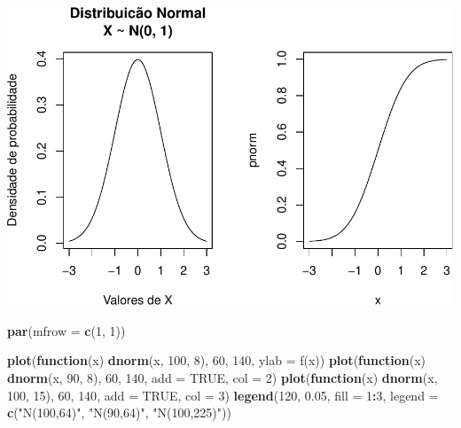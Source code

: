 \documentclass[
]{book}
\newenvironment{Shaded}{\begin{snugshade}}{\end{snugshade}}
\newcommand{\AttributeTok}[1]{\textcolor[rgb]{0.13,0.29,0.53}{#1}}
\newcommand{\ConstantTok}[1]{\textcolor[rgb]{0.56,0.35,0.01}{#1}}
\newcommand{\ControlFlowTok}[1]{\textcolor[rgb]{0.13,0.29,0.53}{\textbf{#1}}}
\newcommand{\DecValTok}[1]{\textcolor[rgb]{0.00,0.00,0.81}{#1}}
\newcommand{\FloatTok}[1]{\textcolor[rgb]{0.00,0.00,0.81}{#1}}
\newcommand{\FunctionTok}[1]{\textcolor[rgb]{0.13,0.29,0.53}{\textbf{#1}}}
\newcommand{\NormalTok}[1]{#1}
\newcommand{\SpecialCharTok}[1]{\textcolor[rgb]{0.81,0.36,0.00}{\textbf{#1}}}
\newcommand{\StringTok}[1]{\textcolor[rgb]{0.31,0.60,0.02}{#1}}
\begin{document}
\includegraphics{introR_files/figure-latex/unnamed-chunk-283-1.pdf}

\begin{Shaded}
\begin{Highlighting}[]
\FunctionTok{par}\NormalTok{(}\AttributeTok{mfrow =} \FunctionTok{c}\NormalTok{(}\DecValTok{1}\NormalTok{, }\DecValTok{1}\NormalTok{))}
\end{Highlighting}
\end{Shaded}

\begin{Shaded}
\begin{Highlighting}[]
\FunctionTok{plot}\NormalTok{(}\ControlFlowTok{function}\NormalTok{(x) }\FunctionTok{dnorm}\NormalTok{(x, }\DecValTok{100}\NormalTok{, }\DecValTok{8}\NormalTok{), }\DecValTok{60}\NormalTok{, }\DecValTok{140}\NormalTok{, }\AttributeTok{ylab =} \StringTok{\textquotesingle{}f(x)\textquotesingle{}}\NormalTok{)}
\FunctionTok{plot}\NormalTok{(}\ControlFlowTok{function}\NormalTok{(x) }\FunctionTok{dnorm}\NormalTok{(x, }\DecValTok{90}\NormalTok{, }\DecValTok{8}\NormalTok{), }\DecValTok{60}\NormalTok{, }\DecValTok{140}\NormalTok{, }\AttributeTok{add =} \ConstantTok{TRUE}\NormalTok{, }\AttributeTok{col =} \DecValTok{2}\NormalTok{)}
\FunctionTok{plot}\NormalTok{(}\ControlFlowTok{function}\NormalTok{(x) }\FunctionTok{dnorm}\NormalTok{(x, }\DecValTok{100}\NormalTok{, }\DecValTok{15}\NormalTok{), }\DecValTok{60}\NormalTok{, }\DecValTok{140}\NormalTok{, }\AttributeTok{add =} \ConstantTok{TRUE}\NormalTok{, }\AttributeTok{col =} \DecValTok{3}\NormalTok{)}
\FunctionTok{legend}\NormalTok{(}\DecValTok{120}\NormalTok{, }\FloatTok{0.05}\NormalTok{, }\AttributeTok{fill =} \DecValTok{1}\SpecialCharTok{:}\DecValTok{3}\NormalTok{,}
       \AttributeTok{legend =} \FunctionTok{c}\NormalTok{(}\StringTok{"N(100,64)"}\NormalTok{, }\StringTok{"N(90,64)"}\NormalTok{, }\StringTok{"N(100,225)"}\NormalTok{))}
\end{Highlighting}
\end{Shaded}
\end{document}
